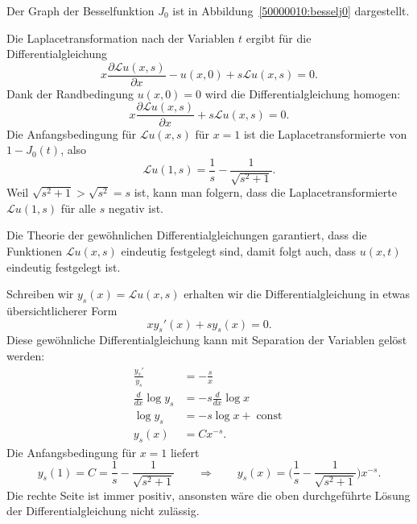 \begin{loesung}
Der Graph der Besselfunktion $J_0$ ist in Abbildung~\ref{50000010:besselj0}
dargestellt.
\begin{teilaufgaben}
\item
Die Laplacetransformation nach der Variablen $t$
ergibt für die Differentialgleichung
\[
x\frac{\partial\mathscr{L}u(x,s)}{\partial x}
-
u(x,0)+s\mathscr{L}u(x,s)=0.
\]
Dank der Randbedingung $u(x,0)=0$ wird die Differentialgleichung
homogen:
\[
x\frac{\partial\mathscr{L}u(x,s)}{\partial x}
+
s\mathscr{L}u(x,s)=0.
\]
Die Anfangsbedingung für $\mathscr{L}u(x,s)$ für $x=1$ ist die
Laplacetransformierte von $1-J_0(t)$, also
\[
\mathscr{L}u(1,s)=\frac1s-\frac{1}{\sqrt{s^2+1}}.
\]
Weil $\sqrt{s^2+1}>\sqrt{s^2}=s$ ist, kann man folgern, dass
die Laplacetransformierte $\mathscr{L}u(1,s)$ für alle $s$ negativ ist.
\item
Die Theorie der gewöhnlichen Differentialgleichungen garantiert, dass
die Funktionen $\mathscr{L}u(x,s)$ eindeutig festgelegt sind, damit folgt
auch, dass $u(x,t)$ eindeutig festgelegt ist.
\item
Schreiben wir $y_s(x)=\mathscr{L}u(x,s)$ erhalten wir die Differentialgleichung
in etwas übersichtlicherer Form
\begin{equation}
xy_s'(x)+sy_s(x)=0.
\label{50000010:sdgl}
\end{equation}
Diese gewöhnliche Differentialgleichung kann mit Separation der
Variablen gelöst werden:
\begin{align*}
\frac{y_s'}{y_s}&=-\frac{s}{x}
\\
\frac{d}{dx}\log y_s&=-s\frac{d}{dx}\log x
\\
\log y_s&=-s\log x+\operatorname{const}
\\
y_s(x)&=Cx^{-s}.
\end{align*}
Die Anfangsbedingung für $x=1$ liefert
\begin{equation}
y_s(1)=C=\frac1s-\frac{1}{\sqrt{s^2 + 1}}
\qquad\Rightarrow\qquad
y_s(x)
=
\biggl(\frac1s-\frac{1}{\sqrt{s^2+1}}\biggr)x^{-s}.
\label{50000010:loesung}
\end{equation}
Die rechte Seite ist immer positiv, ansonsten wäre die oben durchgeführte
Lösung der Differentialgleichung nicht zulässig.
\end{teilaufgaben}
\end{loesung}

